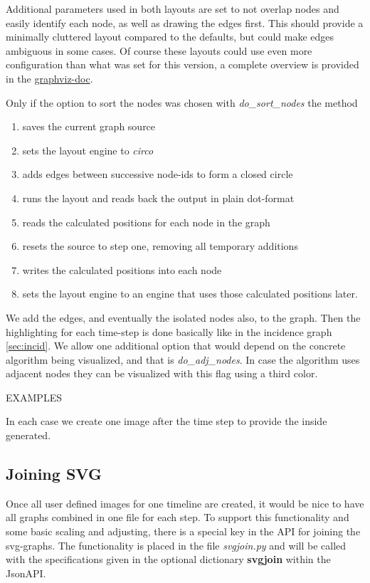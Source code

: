 \documentclass[a4paper, 12pt, bibliography=totoc]{scrartcl}
\begin{document}
Additional parameters used in both layouts are set to not overlap nodes and easily identify each node, as well as drawing the edges first. This should provide a minimally cluttered layout compared to the defaults, but could make edges ambiguous in some cases. Of course these layouts could use even more configuration than what was set for this version, a complete overview is provided in the \href{https://graphviz.org/doc/info/attrs.html}{graphviz-doc}. 

Only if the option to sort the nodes was chosen with \textit{do\_sort\_nodes} the method
\begin{enumerate}
	\item saves the current graph source 
	\item sets the layout engine to \textit{circo}
	\item adds edges between successive node-ids to form a closed circle
	\item runs the layout and reads back the output in plain dot-format
	\item reads the calculated positions for each node in the graph
	\item resets the source to step one, removing all temporary additions
	\item writes the calculated positions into each node
	\item sets the layout engine to an engine that uses those calculated positions later.
\end{enumerate}

We add the edges, and eventually the isolated nodes also, to the graph.
Then the highlighting for each time-step is done basically like in the incidence graph \ref{sec:incid}.
We allow one additional option that would depend on the concrete algorithm being visualized, and that is \textit{do\_adj\_nodes}.
In case the algorithm uses adjacent nodes they can be visualized with this flag using a third color.

EXAMPLES

In each case we create one image after the time step to provide the inside generated.

\subsection{Joining SVG}\label{sec:svgjoin}
Once all user defined images for one timeline are created, it would be nice to have all graphs combined in one file for each step.
To support this functionality and some basic scaling and adjusting, there is a special key in the API for joining the svg-graphs. 
The functionality is placed in the file \textit{svgjoin.py} and will be called with the specifications given in the optional dictionary \textbf{svgjoin} within the JsonAPI.
\end{document}
